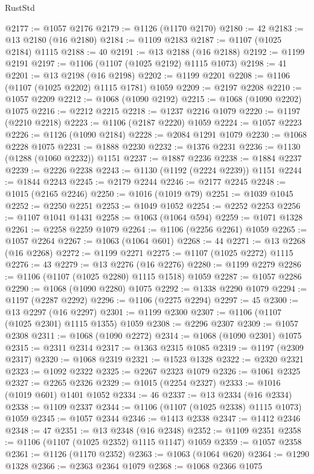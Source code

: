 \begin{lexlean}{RustStd}
\begin{coremodule}
@2177 := @1057 @2176
@2179 := @1126 (@1170 @2170)
@2180 := 42
@2183 := @13 @2180 (@16 @2180)
@2184 := @1109 @2183
@2187 := @1107 (@1025 @2184) @1115
@2188 := 40
@2191 := @13 @2188 (@16 @2188)
@2192 := @1199 @2191
@2197 := @1106 (@1107 (@1025 @2192) @1115 @1073)
@2198 := 41
@2201 := @13 @2198 (@16 @2198)
@2202 := @1199 @2201
@2208 := @1106 (@1107 (@1025 @2202) @1115 @1781) @1059
@2209 := @2197 @2208
@2210 := @1057 @2209
@2212 := @1068 (@1090 @2192)
@2215 := @1068 (@1090 @2202) @1075
@2216 := @2212 @2215
@2218 := @1237 @2216 @1079
@2220 := @1197 (@2210 @2218)
@2223 := @1106 (@2187 @2220) @1059
@2224 := @1057 @2223
@2226 := @1126 (@1090 @2184)
@2228 := @2084 @1291 @1079
@2230 := @1068 @2228 @1075
@2231 := @1888 @2230
@2232 := @1376 @2231
@2236 := @1130 (@1288 (@1060 @2232)) @1151
@2237 := @1887 @2236
@2238 := @1884 @2237
@2239 := @2226 @2238
@2243 := @1130 (@1192 (@2224 @2239)) @1151
@2244 := @1844 @2243
@2245 := @2179 @2244
@2246 := @2177 @2245
@2248 := @1015 (@2165 @2246)
@2250 := @1016 (@1019 @79)
@2251 := @1039 @1045
@2252 := @2250 @2251
@2253 := @1049 @1052
@2254 := @2252 @2253
@2256 := @1107 @1041 @1431
@2258 := @1063 (@1064 @594)
@2259 := @1071 @1328
@2261 := @2258 @2259 @1079
@2264 := @1106 (@2256 @2261) @1059
@2265 := @1057 @2264
@2267 := @1063 (@1064 @601)
@2268 := 44
@2271 := @13 @2268 (@16 @2268)
@2272 := @1199 @2271
@2275 := @1107 (@1025 @2272) @1115
@2276 := 43
@2279 := @13 @2276 (@16 @2276)
@2280 := @1199 @2279
@2286 := @1106 (@1107 (@1025 @2280) @1115 @1518) @1059
@2287 := @1057 @2286
@2290 := @1068 (@1090 @2280) @1075
@2292 := @1338 @2290 @1079
@2294 := @1197 (@2287 @2292)
@2296 := @1106 (@2275 @2294)
@2297 := 45
@2300 := @13 @2297 (@16 @2297)
@2301 := @1199 @2300
@2307 := @1106 (@1107 (@1025 @2301) @1115 @1355) @1059
@2308 := @2296 @2307
@2309 := @1057 @2308
@2311 := @1068 (@1090 @2272)
@2314 := @1068 (@1090 @2301) @1075
@2315 := @2311 @2314
@2317 := @1363 @2315 @1085
@2319 := @1197 (@2309 @2317)
@2320 := @1068 @2319
@2321 := @1523 @1328
@2322 := @2320 @2321
@2323 := @1092 @2322
@2325 := @2267 @2323 @1079
@2326 := @1061 @2325
@2327 := @2265 @2326
@2329 := @1015 (@2254 @2327)
@2333 := @1016 (@1019 @601) @1401 @1052
@2334 := 46
@2337 := @13 @2334 (@16 @2334)
@2338 := @1109 @2337
@2344 := @1106 (@1107 (@1025 @2338) @1115 @1073) @1059
@2345 := @1057 @2344
@2346 := @1413 @2338
@2347 := @1412 @2346
@2348 := 47
@2351 := @13 @2348 (@16 @2348)
@2352 := @1109 @2351
@2358 := @1106 (@1107 (@1025 @2352) @1115 @1147) @1059
@2359 := @1057 @2358
@2361 := @1126 (@1170 @2352)
@2363 := @1063 (@1064 @620)
@2364 := @1290 @1328
@2366 := @2363 @2364 @1079
@2368 := @1068 @2366 @1075

\end{coremodule}
\end{lexlean}
